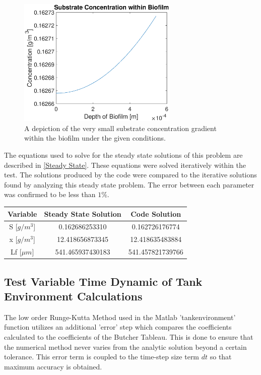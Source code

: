 \documentclass[letterpaper, twoside]{article}
\numberwithin{equation}{section}
\begin{document}
\begin{figure}[H]
  \centering
  \includegraphics[read=eps, width=3in]{SteadyState_Figure1.eps}
  \caption{A depiction of the very small substrate concentration gradient within the biofilm under the given conditions.}
\end{figure}

The equations used to solve for the steady state solutions of this problem are described in \ref{Steady State}. These equations were solved iteratively within the test. The solutions produced by the code were compared to the iterative solutions found by analyzing this steady state problem. The error between each parameter was confirmed to be less than $1\%$.

\begin{center}
\begin{tabular}{ | c | c | c | } 
\hline
 \textbf{Variable} & \textbf{Steady State Solution} & \textbf{Code Solution} \\ 
 \hline
 S [{$g/m^3$}]  & 0.162686253310 & 0.162726176774 \\ 
 \hline
 x  [{$g/m^3$}] & 12.418656873345 & 12.418635483884 \\
 \hline
 Lf  [{$\mu m$}] & 541.465937430183 & 541.457821739766 \\
\hline
\end{tabular}
\end{center}


\subsection{Test Variable Time Dynamic of Tank Environment Calculations}
The low order Runge-Kutta Method used in the Matlab 'tankenvironment' function utilizes an additional 'error' step which compares the coefficients calculated to the coefficients of the Butcher Tableau. This is done to ensure that the numerical method never varies from the analytic solution beyond a certain tolerance. This error term is coupled to the time-step size term $dt$ so that maximum accuracy is obtained. 
\end{document}
